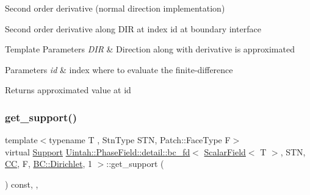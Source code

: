 Second order derivative (normal direction implementation) 

Second order derivative along D\+IR at index id at boundary interface


\begin{DoxyTemplParams}{Template Parameters}
{\em D\+IR} & Direction along with derivative is approximated \\
\hline
\end{DoxyTemplParams}

\begin{DoxyParams}{Parameters}
{\em id} & index where to evaluate the finite-\/difference \\
\hline
\end{DoxyParams}
\begin{DoxyReturn}{Returns}
approximated value at id 
\end{DoxyReturn}
\mbox{\label{classUintah_1_1PhaseField_1_1detail_1_1bc__fd_3_01ScalarField_3_01T_01_4_00_01STN_00_01CC_00_01Fa77b2fd7fb77d0a4dc6c86c68d4ea0bc_a7cc7b8ca9e9f4663a5363f5bb9069934}} 
\subsubsection{\texorpdfstring{get\+\_\+support()}{get\_support()}}
{\footnotesize\ttfamily template$<$typename T , Stn\+Type S\+TN, Patch\+::\+Face\+Type F$>$ \\
virtual \hyperlink{classUintah_1_1PhaseField_1_1Support}{Support} \hyperlink{classUintah_1_1PhaseField_1_1detail_1_1bc__fd}{Uintah\+::\+Phase\+Field\+::detail\+::bc\+\_\+fd}$<$ \hyperlink{structUintah_1_1PhaseField_1_1ScalarField}{Scalar\+Field}$<$ T $>$, S\+TN, \hyperlink{namespaceUintah_1_1PhaseField_a33d355affda78a83f45755ba8388cedda22303704507d024d1d6508ed9859a85a}{CC}, F, \hyperlink{namespaceUintah_1_1PhaseField_a148fba372aa3be96fd6eede7a2fa10b5abac152b762896edff34ed668ae1a546f}{B\+C\+::\+Dirichlet}, 1 $>$\+::get\+\_\+support (\begin{DoxyParamCaption}{ }\end{DoxyParamCaption}) const\hspace{0.3cm}{\ttfamily [inline]}, {\ttfamily [override]}, {\ttfamily [virtual]}}



